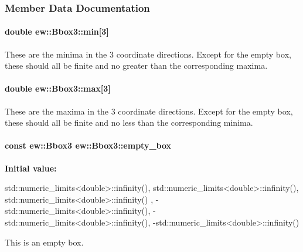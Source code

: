 \subsubsection{Member Data Documentation}
\hypertarget{classew_1_1Bbox3_a386445b5ea3806503e33993943843afc}{
\paragraph[{min}]{\setlength{\rightskip}{0pt plus 5cm}double {\bf ew::Bbox3::min}\mbox{[}3\mbox{]}}\hfill}
\label{classew_1_1Bbox3_a386445b5ea3806503e33993943843afc}
These are the minima in the 3 coordinate directions. Except for the empty box, these should all be finite and no greater than the corresponding maxima. \hypertarget{classew_1_1Bbox3_a33f29d6f0df32349cbfc36e441ee646d}{
\paragraph[{max}]{\setlength{\rightskip}{0pt plus 5cm}double {\bf ew::Bbox3::max}\mbox{[}3\mbox{]}}\hfill}
\label{classew_1_1Bbox3_a33f29d6f0df32349cbfc36e441ee646d}
These are the maxima in the 3 coordinate directions. Except for the empty box, these should all be finite and no less than the corresponding minima. \hypertarget{classew_1_1Bbox3_ae34792fc91bdc9abaa9d17ee55936169}{
\paragraph[{empty\_\-box}]{\setlength{\rightskip}{0pt plus 5cm}const {\bf ew::Bbox3} {\bf ew::Bbox3::empty\_\-box}}\hfill}
\label{classew_1_1Bbox3_ae34792fc91bdc9abaa9d17ee55936169}
{\bfseries Initial value:}
\begin{DoxyCode}
 {
  {
    std::numeric_limits<double>::infinity(),
    std::numeric_limits<double>::infinity(),
    std::numeric_limits<double>::infinity()
  }, {
    -std::numeric_limits<double>::infinity(),
    -std::numeric_limits<double>::infinity(),
    -std::numeric_limits<double>::infinity()
  }
}
\end{DoxyCode}
This is an empty box. 